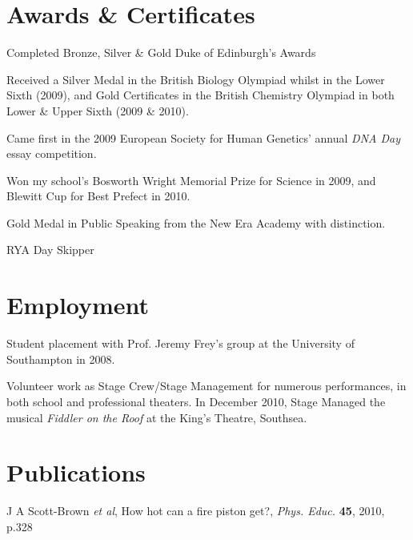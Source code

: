 \documentclass[letterpaper]{article}
\renewenvironment{itemize}{
  \begin{list}{}{
    \setlength{\leftmargin}{1.5em}
  }
}{
  \end{list}
}
\begin{document}
\section*{Awards \& Certificates}
\begin{itemize}
	\item Completed Bronze, Silver \& Gold Duke of Edinburgh's Awards
	\item Received a Silver Medal in the British Biology Olympiad whilst in the Lower Sixth (2009), and Gold Certificates in the British Chemistry Olympiad in both Lower \& Upper Sixth (2009 \& 2010). 
	\item Came first in the 2009 European Society for Human Genetics' annual \textit{DNA Day} essay competition. 
	\item Won my school's Bosworth Wright Memorial Prize for Science in 2009, and Blewitt Cup for Best Prefect in 2010.
 	\item Gold Medal in Public Speaking from the New Era Academy with distinction.
	\item RYA Day Skipper
\end{itemize}

\section*{Employment}
\begin{itemize}
	\item Student placement with Prof. Jeremy Frey's group at the University of Southampton in 2008.
	\item Volunteer work as Stage Crew/Stage Management for numerous performances, in both school and professional theaters. In December 2010, Stage Managed the musical \textit{Fiddler on the Roof} at the King's Theatre, Southsea.
\end{itemize}

\section*{Publications}
\begin{itemize}
\item J A Scott-Brown \textit{et al}, How hot can a fire piston get?, \textit{Phys. Educ.} {\bf 45}, 2010, p.328
\end{itemize}
\end{document}
